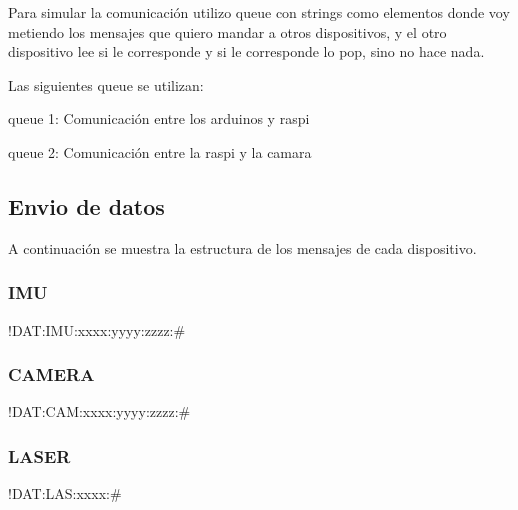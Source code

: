 Para simular la comunicación utilizo queue con strings como elementos donde voy metiendo los mensajes que quiero mandar a otros dispositivos, y el otro dispositivo lee si le corresponde y si le corresponde lo pop, sino no hace nada.

Las siguientes queue se utilizan\+:
\begin{DoxyItemize}
\item queue 1\+: Comunicación entre los arduinos y raspi
\item queue 2\+: Comunicación entre la raspi y la camara
\end{DoxyItemize}

\subsection*{Envio de datos}

A continuación se muestra la estructura de los mensajes de cada dispositivo. \subsubsection*{I\+MU}

!\+D\+AT\+:I\+M\+U\+:xxxx\+:yyyy\+:zzzz\+:\#

\subsubsection*{C\+A\+M\+E\+RA}

!\+D\+AT\+:C\+A\+M\+:xxxx\+:yyyy\+:zzzz\+:\#

\subsubsection*{L\+A\+S\+ER}

!\+D\+AT\+:L\+A\+S\+:xxxx\+:\# 